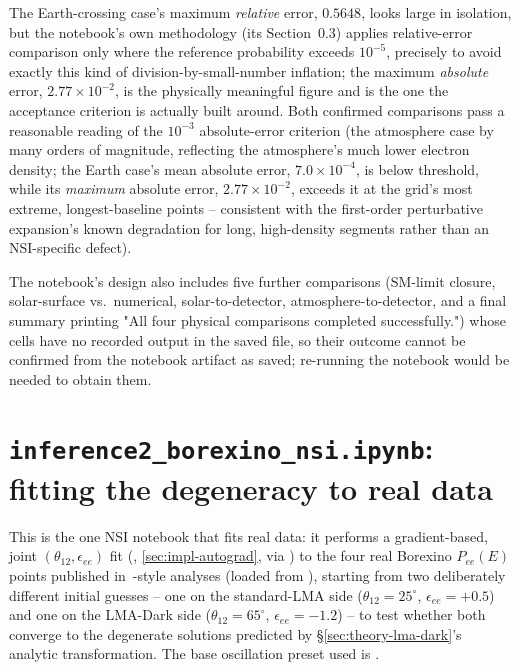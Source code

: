 \begin{notebox}
The Earth-crossing case's maximum \emph{relative} error, $0.5648$, looks
large in isolation, but the notebook's own methodology (its Section~0.3)
applies relative-error comparison only where the reference probability
exceeds $10^{-5}$, precisely to avoid exactly this kind of division-by-small-number
inflation; the maximum \emph{absolute} error, $2.77\times10^{-2}$, is the
physically meaningful figure and is the one the acceptance criterion is
actually built around. Both confirmed comparisons pass a reasonable reading
of the $10^{-3}$ absolute-error criterion (the atmosphere case by many
orders of magnitude, reflecting the atmosphere's much lower electron
density; the Earth case's mean absolute error, $7.0\times10^{-4}$, is below
threshold, while its \emph{maximum} absolute error, $2.77\times10^{-2}$,
exceeds it at the grid's most extreme, longest-baseline points -- consistent
with the first-order perturbative expansion's known degradation for long,
high-density segments rather than an NSI-specific defect).

The notebook's design also includes five further comparisons (SM-limit
closure, solar-surface  vs.\ numerical,
solar-to-detector, atmosphere-to-detector, and a final
 summary printing "All four physical
comparisons completed successfully.") whose cells have no recorded output
in the saved file, so their outcome cannot be confirmed from the notebook
artifact as saved; re-running the notebook would be needed to obtain them.
\end{notebox}

\section{\texttt{inference2\_borexino\_nsi.ipynb}: fitting the degeneracy to real data}
\label{sec:results-borexino-nsi}

\begin{implbox}
This is the one NSI notebook that fits real data: it performs a
gradient-based, joint $(\theta_{12},\epsilon_{ee})$ fit
(, \cref{sec:impl-autograd}, via
) to the four real Borexino $P_{ee}(E)$
points published in~\parencite{Esteban2018LMADark}-style analyses (loaded
from ),
starting from two deliberately different initial guesses -- one on the
standard-LMA side ($\theta_{12}=25^\circ$, $\epsilon_{ee}=+0.5$) and one on
the LMA-Dark side ($\theta_{12}=65^\circ$, $\epsilon_{ee}=-1.2$) -- to test
whether both converge to the degenerate solutions predicted by
\S\ref{sec:theory-lma-dark}'s analytic transformation. The base oscillation
preset used is .
\end{implbox}

